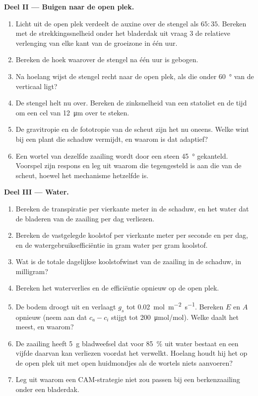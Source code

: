 \begin{problem}
\medskip
\noindent\textbf{Deel II --- Buigen naar de open plek.}
\begin{enumerate}[resume]
  \item Licht uit de open plek verdeelt de auxine over de stengel als
        $65 : 35$. Bereken met de strekkingssnelheid onder het bladerdak
        uit vraag 3 de relatieve verlenging van elke kant van de groeizone
        in één uur.
  \item Bereken de hoek waarover de stengel na één uur is gebogen.
  \item Na hoelang wijst de stengel recht naar de open plek, als die onder
        \qty{60}{\degree} van de verticaal ligt?
  \item De stengel helt nu over. Bereken de zinksnelheid van een statoliet
        en de tijd om een cel van \qty{12}{\micro m} over te steken.
  \item De gravitropie en de fototropie van de scheut zijn het nu oneens.
        Welke wint bij een plant die schaduw vermijdt, en waarom is dat
        adaptief?
  \item Een wortel van dezelfde zaailing wordt door een steen
        \qty{45}{\degree} gekanteld. Voorspel zijn respons en leg uit waarom
        die tegengesteld is aan die van de scheut, hoewel het mechanisme
        hetzelfde is.
\end{enumerate}

\medskip
\noindent\textbf{Deel III --- Water.}
\begin{enumerate}[resume]
  \item Bereken de transpiratie per vierkante meter in de schaduw, en het
        water dat de bladeren van de zaailing per dag verliezen.
  \item Bereken de vastgelegde koolstof per vierkante meter per seconde en
        per dag, en de watergebruiksefficiëntie in gram water per gram
        koolstof.
  \item Wat is de totale dagelijkse koolstofwinst van de zaailing in de
        schaduw, in milligram?
  \item Bereken het waterverlies en de efficiëntie opnieuw op de open plek.
  \item De bodem droogt uit en  verlaagt $g_s$ tot
        \qty{0.02}{mol.m^{-2}.s^{-1}}. Bereken $E$ en $A$ opnieuw (neem aan
        dat $c_a - c_i$ stijgt tot \qty{200}{\micro mol/mol}). Welke daalt
        het meest, en waarom?
  \item De zaailing heeft \qty{5}{g} bladweefsel dat voor \qty{85}{\%} uit
        water bestaat en een vijfde daarvan kan verliezen voordat het
        verwelkt. Hoelang houdt hij het op de open plek uit met open
        huidmondjes als de wortels niets aanvoeren?
  \item Leg uit waarom een CAM-strategie niet zou passen bij een
        berkenzaailing onder een bladerdak.
\end{enumerate}


\end{problem}
